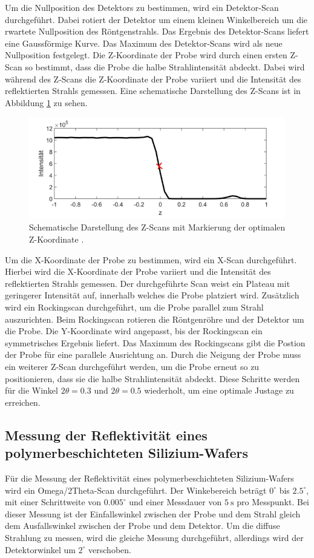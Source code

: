 Um die Nullposition des Detektors zu bestimmen, wird ein Detektor-Scan durchgeführt.
Dabei rotiert der Detektor um einem kleinen Winkelbereich um die rwartete Nullposition des Röntgenstrahls.
Das Ergebnis des Detektor-Scans liefert eine Gaussförmige Kurve.
Das Maximum des Detektor-Scans wird als neue Nullposition festgelegt.
Die Z-Koordinate der Probe wird durch einen ersten Z-Scan so bestimmt, dass die Probe die halbe Strahlintensität abdeckt.
Dabei wird während des Z-Scans die Z-Koordinate der Probe variiert und die Intensität des reflektierten Strahls gemessen.
Eine schematische Darstellung des Z-Scans ist in Abbildung \ref{fig:zscan} zu sehen.
\begin{figure}[H]
    \centering
    \includegraphics[width=\textwidth]{Bilder/zscan.png}
    \caption{Schematische Darstellung des Z-Scans mit Markierung der optimalen Z-Koordinate \cite{sample}.}
    \label{fig:zscan}
\end{figure}
Um die X-Koordinate der Probe zu bestimmen, wird ein X-Scan durchgeführt.
Hierbei wird die X-Koordinate der Probe variiert und die Intensität des reflektierten Strahls gemessen.
Der durchgeführte Scan weist ein Plateau mit geringerer Intensität auf, innerhalb welches die Probe platziert wird.
Zusätzlich wird ein Rockingscan durchgeführt, um die Probe parallel zum Strahl auszurichten.
Beim Rockingscan rotieren die Röntgenröhre und der Detektor um die Probe.
Die Y-Koordinate wird angepasst, bis der Rockingscan ein symmetrisches Ergebnis liefert.
Das Maximum des Rockingscans gibt die Postion der Probe für eine parallele Ausrichtung an.
Durch die Neigung der Probe muss ein weiterer Z-Scan durchgeführt werden, um die Probe erneut so zu positionieren, dass sie die halbe Strahlintensität abdeckt.
Diese Schritte werden für die Winkel $2 \theta = 0.3$ und $2 \theta = 0.5$ wiederholt, um eine optimale Justage zu erreichen.

\subsection{Messung der Reflektivität eines polymerbeschichteten Silizium-Wafers}
\label{subsec:Messung}
Für die Messung der Reflektivität eines polymerbeschichteten Silizium-Wafers wird ein Omega/2Theta-Scan durchgeführt.
Der Winkebereich beträgt $0^\circ$ bis $2.5^\circ$, mit einer Schrittweite von $0.005^\circ$ und einer Messdauer von $\SI{5}{\second}$ pro Messpunkt.
Bei dieser Messung ist der Einfallswinkel zwischen der Probe und dem Strahl gleich dem Ausfallswinkel zwischen der Probe und dem Detektor.
Um die diffuse Strahlung zu messen, wird die gleiche Messung durchgeführt, allerdings wird der Detektorwinkel um $2^\circ$ verschoben.